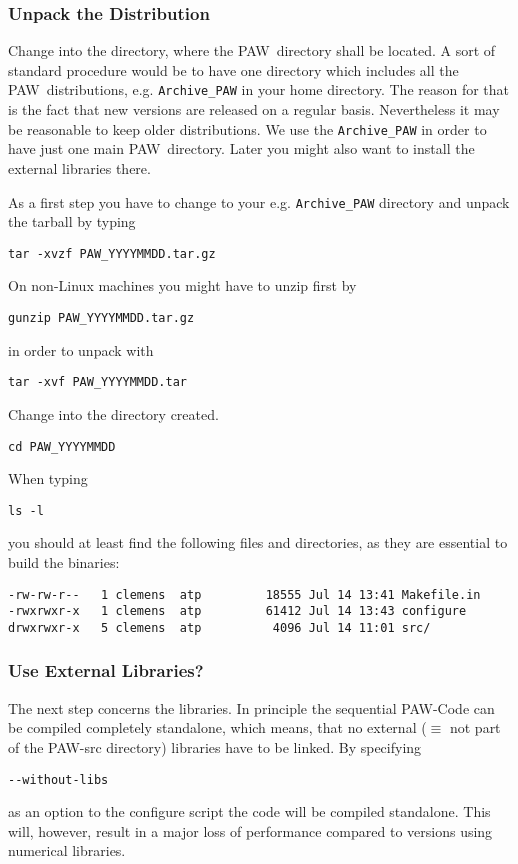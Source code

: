 \documentclass[a4paper,10pt]{article}
\newcommand{\PAW}{\textsc{PAW}}
\begin{document}
\subsubsection*{Unpack the Distribution}
\label{sub:unpack}
Change into the directory, where the \PAW\ directory shall be located.  A sort
of standard procedure would be to have one directory which includes all the
\PAW\ distributions, e.g. \texttt{Archive\_PAW} in your home directory.  The
reason for that is the fact that new versions are released on a regular
basis. Nevertheless it may be reasonable to keep older distributions.  We use
the \texttt{Archive\_PAW} in order to have just one main \PAW\ directory.
Later you might also want to install the external libraries there.


As a first step you have to change to your e.g. \texttt{Archive\_PAW} directory
and unpack the tarball by typing
\begin{verbatim}
tar -xvzf PAW_YYYYMMDD.tar.gz
\end{verbatim}
On non-Linux machines you might have to unzip first by
\begin{verbatim}
gunzip PAW_YYYYMMDD.tar.gz
\end{verbatim}
in order to unpack with
\begin{verbatim}
tar -xvf PAW_YYYYMMDD.tar
\end{verbatim}
Change into the directory created.
\begin{verbatim}
cd PAW_YYYYMMDD
\end{verbatim}
When typing
\begin{verbatim}
ls -l
\end{verbatim}
you should at least find the following files and directories, as they are
essential to build the binaries:
\begin{verbatim}
-rw-rw-r--   1 clemens  atp         18555 Jul 14 13:41 Makefile.in
-rwxrwxr-x   1 clemens  atp         61412 Jul 14 13:43 configure
drwxrwxr-x   5 clemens  atp          4096 Jul 14 11:01 src/
\end{verbatim}

\subsubsection*{Use External Libraries?}
\label{sub:libs}
The next step concerns the libraries.  In principle the sequential \PAW-Code
can be compiled completely standalone, which means, that no external ($\equiv$
not part of the \PAW-src directory) libraries have to be linked.  By specifying
\begin{verbatim}
--without-libs
\end{verbatim}
as an option to the configure script the code will be compiled standalone.
This will, however, result in a major loss of performance compared to versions
using numerical libraries.
\end{document}
